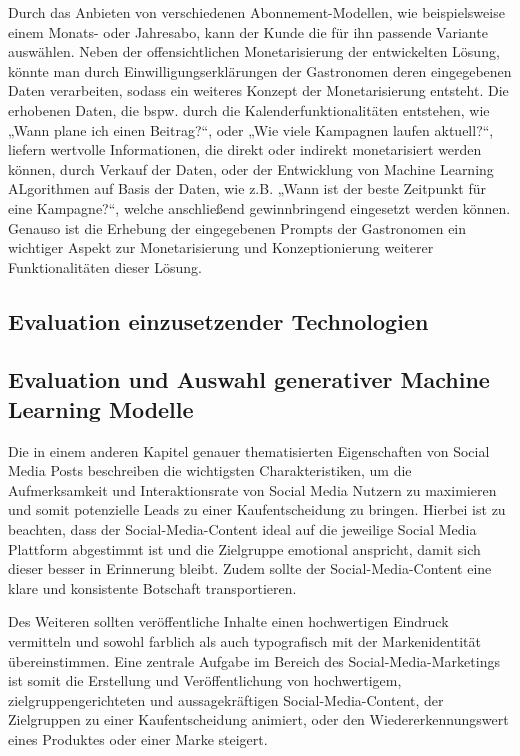 Durch das Anbieten von verschiedenen Abonnement-Modellen, wie beispielsweise einem Monats- oder Jahresabo, kann der Kunde die für ihn passende Variante auswählen.
Neben der offensichtlichen Monetarisierung der entwickelten Lösung, könnte man durch Einwilligungserklärungen der Gastronomen deren eingegebenen Daten verarbeiten, sodass ein weiteres Konzept der Monetarisierung entsteht.
Die erhobenen Daten, die bspw. durch die Kalenderfunktionalitäten entstehen, wie „Wann plane ich einen Beitrag?“, oder „Wie viele Kampagnen laufen aktuell?“, liefern wertvolle Informationen, die direkt oder indirekt monetarisiert werden können, durch Verkauf der Daten, oder der Entwicklung von Machine Learning ALgorithmen auf Basis der Daten, wie z.B. „Wann ist der beste Zeitpunkt für eine Kampagne?“, welche anschließend gewinnbringend eingesetzt werden können.
Genauso ist die Erhebung der eingegebenen Prompts der Gastronomen ein wichtiger Aspekt zur Monetarisierung und Konzeptionierung weiterer Funktionalitäten dieser Lösung.

\subsection{Evaluation einzusetzender Technologien}

\subsection{Evaluation und Auswahl generativer Machine Learning Modelle} %
Die in einem anderen Kapitel genauer thematisierten Eigenschaften von Social Media Posts beschreiben die wichtigsten Charakteristiken, um die Aufmerksamkeit und Interaktionsrate von Social Media Nutzern zu maximieren und somit potenzielle Leads zu einer Kaufentscheidung zu bringen.
Hierbei ist zu beachten, dass der Social-Media-Content ideal auf die jeweilige Social Media Plattform abgestimmt ist und die Zielgruppe emotional anspricht, damit sich dieser besser in Erinnerung bleibt.
Zudem sollte der Social-Media-Content eine klare und konsistente Botschaft transportieren.

Des Weiteren sollten veröffentliche Inhalte einen hochwertigen Eindruck vermitteln und sowohl farblich als auch typografisch mit der Markenidentität übereinstimmen.
Eine zentrale Aufgabe im Bereich des Social-Media-Marketings ist somit die Erstellung und Veröffentlichung von hochwertigem, zielgruppengerichteten und aussagekräftigen Social-Media-Content, der Zielgruppen zu einer Kaufentscheidung animiert, oder den Wiedererkennungswert eines Produktes oder einer Marke steigert.

